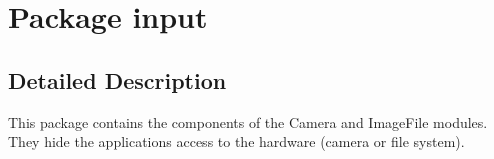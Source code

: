 \hypertarget{namespaceinput}{}\section{Package input}
\label{namespaceinput}


\subsection{Detailed Description}
This package contains the components of the Camera and Image\+File modules. They hide the applications access to the hardware (camera or file system). 